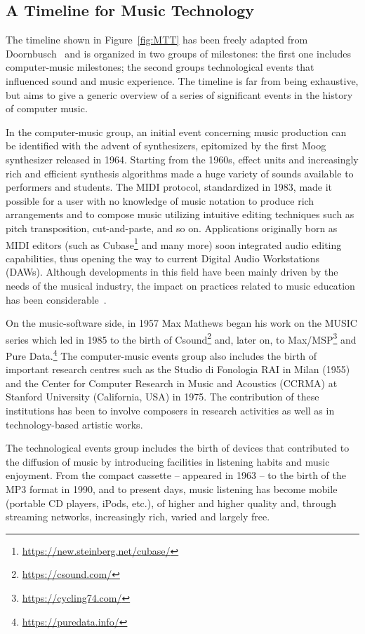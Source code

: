 \documentclass[journal]{IEEEtran}
\begin{document}
\subsection{A Timeline for Music Technology}
\label{subsec:TL}

The timeline shown in Figure~\ref{fig:MTT} has been freely adapted from Doornbusch~\cite{keislar2009historical} and is organized in two groups of milestones: the first one includes computer-music milestones; the second groups technological events that influenced sound and music experience. The timeline is far from being exhaustive, but aims to give a generic overview of a series of significant events in the history of computer music.

In the computer-music group, an initial event concerning music production can be identified with the advent of synthesizers, epitomized by the first Moog synthesizer released in 1964. Starting from the 1960s, effect units and increasingly rich and efficient synthesis algorithms made a huge variety of sounds available to performers and students. The MIDI protocol, standardized in 1983, made it possible for a user with no knowledge of music notation to produce rich arrangements and to compose music utilizing intuitive editing techniques such as pitch transposition, cut-and-paste, and so on. Applications originally born as MIDI editors (such as Cubase\footnote{\url{https://new.steinberg.net/cubase/}} and many more) soon integrated audio editing capabilities, thus opening the way to current Digital Audio Workstations (DAWs). Although developments in this field have been mainly driven by the needs of the musical industry, the impact on practices related to music education has been considerable~\cite{webster2012computers}.

On the music-software side, in 1957 Max Mathews began his work on the MUSIC series which led in 1985 to the birth of Csound\footnote{\url{https://csound.com/}} and, later on, to Max/MSP\footnote{\url{https://cycling74.com/}} and Pure Data.\footnote{\url{https://puredata.info/}} The computer-music events group also includes the birth of important research centres such as the Studio di Fonologia RAI in Milan (1955) and the Center for Computer Research in Music and Acoustics (CCRMA) at Stanford University (California, USA) in 1975. The contribution of these institutions has been to involve composers in research activities as well as in technology-based artistic works.  

The technological events group includes the birth of devices that contributed to the diffusion of music by introducing facilities in listening habits and music enjoyment. From the compact cassette -- appeared in 1963 -- to the birth of the MP3 format in 1990, and to present days, music listening has become mobile (portable CD players, iPods, etc.), of higher and higher quality and, through streaming networks, increasingly rich, varied and largely free. 
\end{document}
